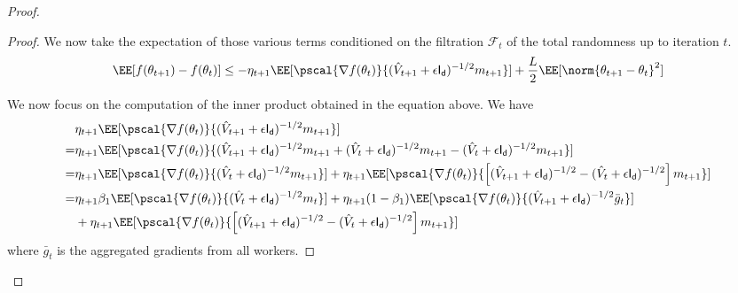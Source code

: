 \documentclass[11pt]{article}
\begin{document}
\begin{proof}
\begin{proof}
We now take the expectation of those various terms conditioned on the filtration $\mathcal{F}_t$ of the total randomness up to iteration $t$.
\begin{equation}\label{eq:smooth1}
\EE[f(\theta_{t+1}) - f(\theta_{t}) ] \leq - \eta_{t+1} \EE[\pscal{\nabla f(\theta_t)}{(\hat{V}_{t+1} + \epsilon \mathsf{I_d})^{-1/2} m_{t+1}}] + \frac{L}{2} \EE[\norm{\theta_{t+1} - \theta_{t}}^2]
\end{equation}

We now focus on the computation of the inner product obtained in the equation above.
We have
\begin{align}
& \eta_{t+1}\EE[ \pscal{\nabla f(\theta_t)}{(\hat{V}_{t+1} + \epsilon \mathsf{I_d})^{-1/2} m_{t+1}}]  \label{innerprod}\\
  = &\eta_{t+1} \EE[\pscal{\nabla f(\theta_t)}{(\hat{V}_{t+1} + \epsilon \mathsf{I_d})^{-1/2} m_{t+1} + (\hat{V}_{t} + \epsilon \mathsf{I_d})^{-1/2} m_{t+1} - (\hat{V}_{t} + \epsilon \mathsf{I_d})^{-1/2} m_{t+1}} ]\notag\\
    = & \eta_{t+1}\EE[ \pscal{\nabla f(\theta_t)}{(\hat{V}_{t} + \epsilon \mathsf{I_d})^{-1/2} m_{t+1}} ] +  \eta_{t+1} \EE[\pscal{\nabla f(\theta_t)}{\left[(\hat{V}_{t+1} + \epsilon \mathsf{I_d})^{-1/2} - (\hat{V}_{t} + \epsilon \mathsf{I_d})^{-1/2}  \right]m_{t+1}}]\notag\\
 = & \eta_{t+1}\beta_1\EE[ \pscal{\nabla f(\theta_t)}{(\hat{V}_{t} + \epsilon \mathsf{I_d})^{-1/2} m_{t}}] +  \eta_{t+1} (1-\beta_1) \EE[\pscal{\nabla f(\theta_t)}{(\hat{V}_{t+1} + \epsilon \mathsf{I_d})^{-1/2} \bar{g}_t}] \notag\\
&+  \eta_{t+1} \EE[\pscal{\nabla f(\theta_t)}{\left[(\hat{V}_{t+1} + \epsilon \mathsf{I_d})^{-1/2} - (\hat{V}_{t} + \epsilon \mathsf{I_d})^{-1/2}  \right]m_{t+1}}] \label{decomp}
\end{align}
where $\bar{g}_t$ is the aggregated gradients from all workers.


\end{proof}
\end{proof}
\end{document}
